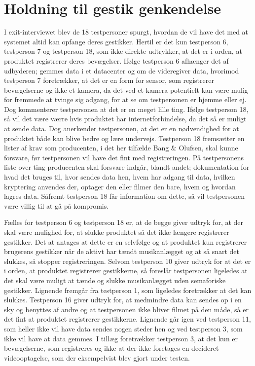 \section{Holdning til gestik genkendelse}
\label{TestresultaterOvervaagning}
%
I exit-interviewet blev de 18 testpersoner spurgt, hvordan de vil have det med at systemet altid kan opfange deres gestikker. Hertil er det kun testperson 6, testperson 7 og testperson 18, som ikke direkte udtrykker, at det er i orden, at produktet registrerer deres bevægelser. Ifølge testperson 6 afhænger det af udbyderen; gemmes data i et datacenter og om de videregiver data, hvorimod testperson 7 foretrækker, at det er en form for sensor, som registrerer bevægelserne og ikke et kamera, da det ved et kamera potentielt kan være mulig for fremmede at tvinge sig adgang, for at se om testpersonen er hjemme eller ej. Dog kommenterer testpersonen at det er en meget lille ting. Ifølge testperson 18, så vil det være værre hvis produktet har internetforbindelse, da det så er muligt at sende data. Dog anerkender testpersonen, at det er en nødvendighed for at produktet både kan blive bedre og lære undervejs. Testperson 18 fremsætter en lister af krav som producenten, i det her tilfælde Bang $\&$ Olufsen, skal kunne forsvare, før testpersonen vil have det fint med registreringen. På testpersonens liste over ting producenten skal forsvare indgår, blandt andet; dokumentation for hvad det bruges til, hvor sendes data hen, hvem har adgang til data, hvilken kryptering anvendes der, optager den eller filmer den bare, hvem og hvordan lagres data. Såfremt testperson 18 får information om dette, så vil testpersonen være villig til at gå på kompromis. 

Fælles for testperson 6 og testperson 18 er, at de begge giver udtryk for, at der skal være mulighed for, at slukke produktet så det ikke længere registrerer gestikker. Det at antages at dette er en selvfølge og at produktet kun registrerer brugerens gestikker når de aktivt har tændt musikanlægget og at så snart det slukkes, så stopper registreringen. Selvom testperson 10 giver udtryk for at det er i orden, at produktet registrerer gestikkerne, så foreslår testpersonen ligeledes at det skal være muligt at tænde og slukke musikanlægget uden semaforiske gestikker. Lignende fremgår fra testperson 1, som ligeledes foretrækker at det kan slukkes. Testperson 16 giver udtryk for, at medmindre data kan sendes op i en sky og benyttes af andre og at testpersonen ikke bliver filmet på den måde, så er det fint at produktet registrerer gestikkerne. Lignende går igen ved testperson 11, som heller ikke vil have data sendes nogen steder hen og ved testperson 3, som ikke vil have at data gemmes. I tillæg foretrækker testperson 3, at det kun er bevægelserne, som registreres og ikke at der ikke foretages en decideret videooptagelse, som der eksempelvist blev gjort under testen.

